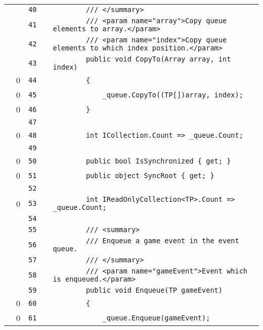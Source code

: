 \documentclass[a4paper,landscape,10pt]{article}
\begin{document}
\begin{longtable}[l]{lrrll}
\cellcolor{gray} &  & \verb~40~ & & \verb~        /// </summary>~\\
\cellcolor{gray} &  & \verb~41~ & & \verb~        /// <param name="array">Copy queue elements to array.</param>~\\
\cellcolor{gray} &  & \verb~42~ & & \verb~        /// <param name="index">Copy queue elements to which index position.</param>~\\
\cellcolor{gray} &  & \verb~43~ & & \verb~        public void CopyTo(Array array, int index)~\\
\cellcolor{red} & 0 & \verb~44~ & & \verb~        {~\\
\cellcolor{red} & 0 & \verb~45~ & & \verb~            _queue.CopyTo((TP[])array, index);~\\
\cellcolor{red} & 0 & \verb~46~ & & \verb~        }~\\
\cellcolor{gray} &  & \verb~47~ & & \verb~~\\
\cellcolor{red} & 0 & \verb~48~ & & \verb~        int ICollection.Count => _queue.Count;~\\
\cellcolor{gray} &  & \verb~49~ & & \verb~~\\
\cellcolor{red} & 0 & \verb~50~ & & \verb~        public bool IsSynchronized { get; }~\\
\cellcolor{red} & 0 & \verb~51~ & & \verb~        public object SyncRoot { get; }~\\
\cellcolor{gray} &  & \verb~52~ & & \verb~~\\
\cellcolor{red} & 0 & \verb~53~ & & \verb~        int IReadOnlyCollection<TP>.Count => _queue.Count;~\\
\cellcolor{gray} &  & \verb~54~ & & \verb~~\\
\cellcolor{gray} &  & \verb~55~ & & \verb~        /// <summary>~\\
\cellcolor{gray} &  & \verb~56~ & & \verb~        /// Enqueue a game event in the event queue.~\\
\cellcolor{gray} &  & \verb~57~ & & \verb~        /// </summary>~\\
\cellcolor{gray} &  & \verb~58~ & & \verb~        /// <param name="gameEvent">Event which is enqueued.</param>~\\
\cellcolor{gray} &  & \verb~59~ & & \verb~        public void Enqueue(TP gameEvent)~\\
\cellcolor{red} & 0 & \verb~60~ & & \verb~        {~\\
\cellcolor{red} & 0 & \verb~61~ & & \verb~            _queue.Enqueue(gameEvent);~\\

\end{longtable}
\end{document}
